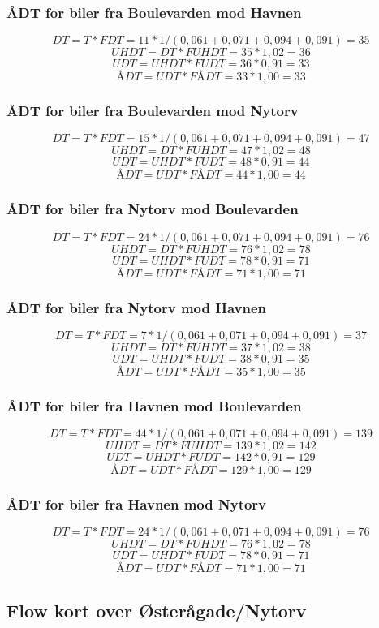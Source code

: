 \subsubsection{ÅDT for biler fra Boulevarden mod Havnen}
$$DT = T * FDT = 11 * 1/(0,061+0,071+0,094+0,091) = 35$$
$$UHDT = DT * FUHDT = 35 * 1,02 = 36$$
$$UDT = UHDT * FUDT = 36 * 0,91 = 33$$
$$ÅDT = UDT * FÅDT = 33 * 1,00 = 33$$
\subsubsection{ÅDT for biler fra Boulevarden mod Nytorv}
$$DT = T * FDT = 15 * 1/(0,061+0,071+0,094+0,091) = 47$$
$$UHDT = DT * FUHDT = 47 * 1,02 = 48$$
$$UDT = UHDT * FUDT = 48 * 0,91 = 44$$
$$ÅDT = UDT * FÅDT = 44 * 1,00 = 44$$
\subsubsection{ÅDT for biler fra Nytorv mod Boulevarden}
$$DT = T * FDT = 24 * 1/(0,061+0,071+0,094+0,091) = 76$$
$$UHDT = DT * FUHDT = 76 * 1,02 = 78$$
$$UDT = UHDT * FUDT = 78 * 0,91 = 71$$
$$ÅDT = UDT * FÅDT = 71 * 1,00 = 71$$
\subsubsection{ÅDT for biler fra Nytorv mod Havnen}
$$DT = T * FDT = 7 * 1/(0,061+0,071+0,094+0,091) = 37$$
$$UHDT = DT * FUHDT = 37 * 1,02 = 38$$
$$UDT = UHDT * FUDT = 38 * 0,91 = 35$$
$$ÅDT = UDT * FÅDT = 35 * 1,00 = 35$$
\subsubsection{ÅDT for biler fra Havnen mod Boulevarden}
$$DT = T * FDT = 44 * 1/(0,061+0,071+0,094+0,091) = 139$$
$$UHDT = DT * FUHDT = 139 * 1,02 = 142$$
$$UDT = UHDT * FUDT = 142 * 0,91 = 129$$
$$ÅDT = UDT * FÅDT = 129 * 1,00 = 129$$
\subsubsection{ÅDT for biler fra Havnen mod Nytorv}
$$DT = T * FDT = 24 * 1/(0,061+0,071+0,094+0,091) = 76$$
$$UHDT = DT * FUHDT = 76 * 1,02 = 78$$
$$UDT = UHDT * FUDT = 78 * 0,91 = 71$$
$$ÅDT = UDT * FÅDT = 71 * 1,00 = 71$$

\subsection{Flow kort over Østerågade/Nytorv}
\label{flow_kort}
